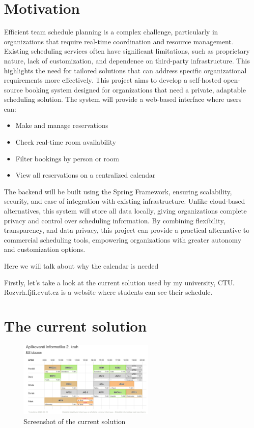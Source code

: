 \section*{Motivation}
Efficient team schedule planning is a complex challenge, particularly in organizations that require real-time coordination and resource management.
Existing scheduling services often have significant limitations, such as proprietary nature, lack of customization, and dependence on third-party infrastructure.
This highlights the need for tailored solutions that can address specific organizational requirements more effectively.
This project aims to develop a self-hosted open-source booking system designed for organizations that need a private, adaptable scheduling solution.
The system will provide a web-based interface where users can:
\begin{itemize}
    \item Make and manage reservations
    \item Check real-time room availability
    \item  Filter bookings by person or room
    \item View all reservations on a centralized calendar
\end{itemize}

The backend will be built using the Spring Framework, ensuring scalability, security, and ease of integration with existing infrastructure.
Unlike cloud-based alternatives, this system will store all data locally, giving organizations complete privacy and control over scheduling information.
By combining flexibility, transparency, and data privacy, this project can provide a practical alternative to commercial scheduling tools, empowering organizations with greater autonomy and customization options.


\pagestyle{headings}
Here we will talk about why the calendar is needed

Firstly, let's take a look at the current solution used by my university, CTU. Rozvrh.fjfi.cvut.cz is a website where students can see their schedule.


\section{The current solution}\label{sec:the-current-solution}
\begin{figure}[h]
    \centering
    \includegraphics[width=0.6\textwidth]{img}
    \caption{Screenshot of the current solution}
    \label{fig:rozvrh}
\end{figure}

